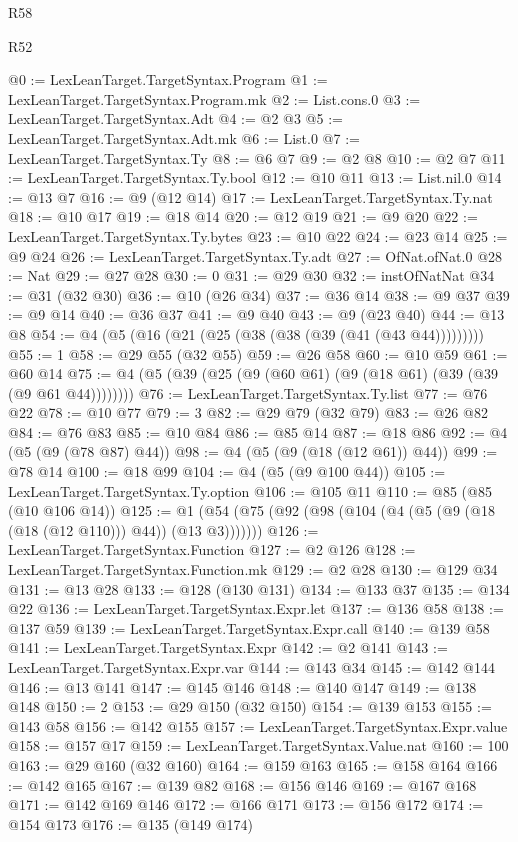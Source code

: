 \begin{lexlean}{R58}
\begin{lexlean}{R52}
\begin{coremodule}
{{{{{{{{{{{{{{{{{{{{{{{{{{{{{{{{{{{{{{{{{{{{{{{{{{{{{{{{{{{{{{{{{{{{{{{{{{{{{{{{{{{{{{{{{{{{{{{{{{{{{{{{{{{{{{{{{{{{{{{{{{{{{{{{{{{{{{{{{{{{{{{{{{{{{{{{{{{{{{{{{{{{{{{{{{{{{{{{{{{{{{{{{{{{{{{{{{{{{{@0 := LexLeanTarget.TargetSyntax.Program
@1 := LexLeanTarget.TargetSyntax.Program.mk
@2 := List.cons.{0}
@3 := LexLeanTarget.TargetSyntax.Adt
@4 := @2 @3
@5 := LexLeanTarget.TargetSyntax.Adt.mk
@6 := List.{0}
@7 := LexLeanTarget.TargetSyntax.Ty
@8 := @6 @7
@9 := @2 @8
@10 := @2 @7
@11 := LexLeanTarget.TargetSyntax.Ty.bool
@12 := @10 @11
@13 := List.nil.{0}
@14 := @13 @7
@16 := @9 (@12 @14)
@17 := LexLeanTarget.TargetSyntax.Ty.nat
@18 := @10 @17
@19 := @18 @14
@20 := @12 @19
@21 := @9 @20
@22 := LexLeanTarget.TargetSyntax.Ty.bytes
@23 := @10 @22
@24 := @23 @14
@25 := @9 @24
@26 := LexLeanTarget.TargetSyntax.Ty.adt
@27 := OfNat.ofNat.{0}
@28 := Nat
@29 := @27 @28
@30 := 0
@31 := @29 @30
@32 := instOfNatNat
@34 := @31 (@32 @30)
@36 := @10 (@26 @34)
@37 := @36 @14
@38 := @9 @37
@39 := @9 @14
@40 := @36 @37
@41 := @9 @40
@43 := @9 (@23 @40)
@44 := @13 @8
@54 := @4 (@5 (@16 (@21 (@25 (@38 (@38 (@39 (@41 (@43 @44)))))))))
@55 := 1
@58 := @29 @55 (@32 @55)
@59 := @26 @58
@60 := @10 @59
@61 := @60 @14
@75 := @4 (@5 (@39 (@25 (@9 (@60 @61) (@9 (@18 @61) (@39 (@39 (@9 @61 @44))))))))
@76 := LexLeanTarget.TargetSyntax.Ty.list
@77 := @76 @22
@78 := @10 @77
@79 := 3
@82 := @29 @79 (@32 @79)
@83 := @26 @82
@84 := @76 @83
@85 := @10 @84
@86 := @85 @14
@87 := @18 @86
@92 := @4 (@5 (@9 (@78 @87) @44))
@98 := @4 (@5 (@9 (@18 (@12 @61)) @44))
@99 := @78 @14
@100 := @18 @99
@104 := @4 (@5 (@9 @100 @44))
@105 := LexLeanTarget.TargetSyntax.Ty.option
@106 := @105 @11
@110 := @85 (@85 (@10 @106 @14))
@125 := @1 (@54 (@75 (@92 (@98 (@104 (@4 (@5 (@9 (@18 (@18 (@12 @110))) @44)) (@13 @3)))))))
@126 := LexLeanTarget.TargetSyntax.Function
@127 := @2 @126
@128 := LexLeanTarget.TargetSyntax.Function.mk
@129 := @2 @28
@130 := @129 @34
@131 := @13 @28
@133 := @128 (@130 @131)
@134 := @133 @37
@135 := @134 @22
@136 := LexLeanTarget.TargetSyntax.Expr.let
@137 := @136 @58
@138 := @137 @59
@139 := LexLeanTarget.TargetSyntax.Expr.call
@140 := @139 @58
@141 := LexLeanTarget.TargetSyntax.Expr
@142 := @2 @141
@143 := LexLeanTarget.TargetSyntax.Expr.var
@144 := @143 @34
@145 := @142 @144
@146 := @13 @141
@147 := @145 @146
@148 := @140 @147
@149 := @138 @148
@150 := 2
@153 := @29 @150 (@32 @150)
@154 := @139 @153
@155 := @143 @58
@156 := @142 @155
@157 := LexLeanTarget.TargetSyntax.Expr.value
@158 := @157 @17
@159 := LexLeanTarget.TargetSyntax.Value.nat
@160 := 100
@163 := @29 @160 (@32 @160)
@164 := @159 @163
@165 := @158 @164
@166 := @142 @165
@167 := @139 @82
@168 := @156 @146
@169 := @167 @168
@171 := @142 @169 @146
@172 := @166 @171
@173 := @156 @172
@174 := @154 @173
@176 := @135 (@149 @174)
}}}}}}}}}}}}}}}}}}}}}}}}}}}}}}}}}}}}}}}}}}}}}}}}}}}}}}}}}}}}}}}}}}}}}}}}}}}}}}}}}}}}}}}}}}}}}}}}}}}}}}}}}}}}}}}}}}}}}}}}}}}}}}}}}}}}}}}}}}}}}}}}}}}}}}}}}}}}}}}}}}}}}}}}}}}}}}}}}}}}}}}}}}}}}}}}}}}}}}
\end{coremodule}
\end{lexlean}
\end{lexlean}
